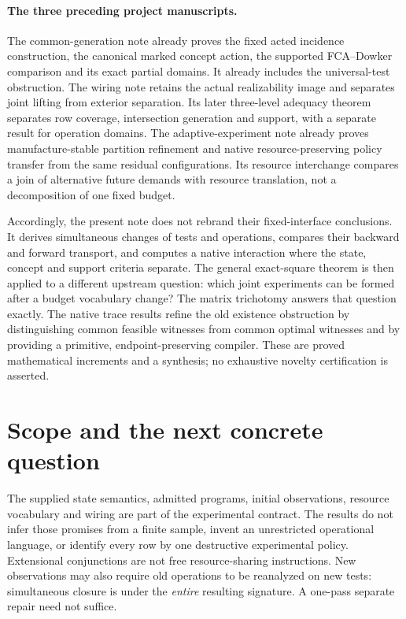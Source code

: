 \documentclass[11pt]{article}
\theoremstyle{definition}\newtheorem{definition}[theorem]{Definition}
\theoremstyle{remark}\newtheorem{remark}[theorem]{Remark}
\begin{document}
\paragraph{The three preceding project manuscripts.}
The common-generation note \cite{Common} already proves the fixed acted
incidence construction, the canonical marked concept action, the supported
FCA--Dowker comparison and its exact partial domains. It already includes
the universal-test obstruction. The wiring note \cite{Wiring} retains
the actual realizability image and separates joint lifting from exterior
separation. Its later three-level adequacy theorem separates row coverage,
intersection generation and support, with a separate result for operation
domains. The adaptive-experiment note \cite{Adaptive} already proves
manufacture-stable partition refinement and native resource-preserving
policy transfer from the same residual configurations. Its resource
interchange compares a join of alternative future demands with resource
translation, not a decomposition of one fixed budget.

Accordingly, the present note does not rebrand their fixed-interface
conclusions. It derives simultaneous changes of tests and operations,
compares their backward and forward transport, and computes a native
interaction where the state, concept and support criteria separate.
The general exact-square theorem is then applied to a different upstream
question: which joint experiments can be formed after a budget vocabulary
change? The matrix trichotomy answers that question exactly. The native
trace results refine the old existence obstruction by distinguishing
common feasible witnesses from common optimal witnesses and by providing
a primitive, endpoint-preserving compiler. These are proved mathematical
increments and a synthesis; no exhaustive novelty certification is asserted.

\section{Scope and the next concrete question}\label{sec:limits}
The supplied state semantics, admitted programs, initial observations,
resource vocabulary and wiring are part of the experimental contract.
The results do not infer those promises from a finite sample, invent an
unrestricted operational language, or identify every row by one destructive
experimental policy. Extensional conjunctions are not free resource-sharing
instructions. New observations may also require old operations to be
reanalyzed on new tests: simultaneous closure is under the \emph{entire}
resulting signature. A one-pass separate repair need not suffice.
\end{document}
